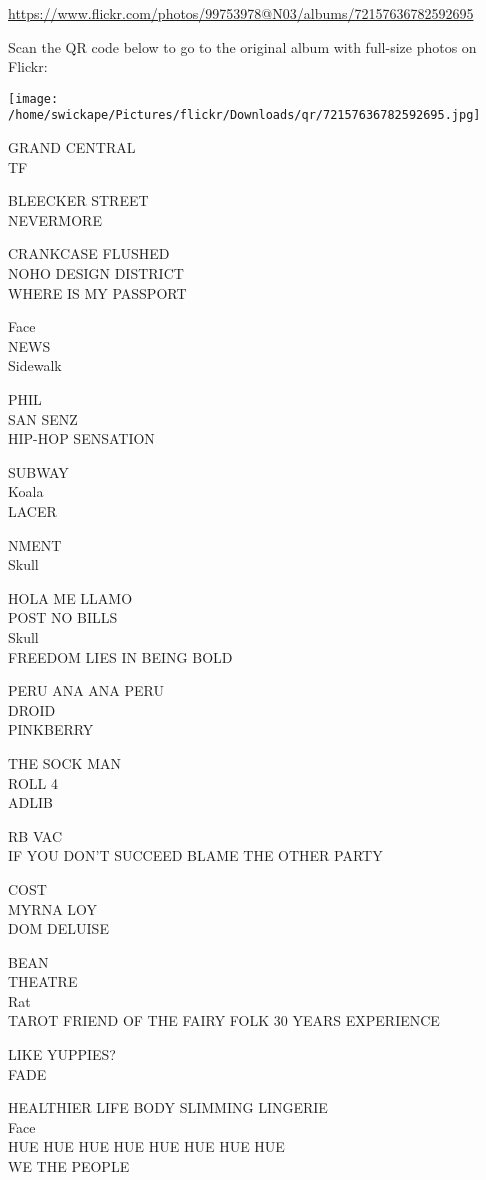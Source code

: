 \documentclass[10pt,letterpaper]{article}
\begin{document}
\url{https://www.flickr.com/photos/99753978@N03/albums/72157636782592695}

Scan the QR code below to go to the original album with full-size photos on Flickr:

\texttt{[image: /home/swickape/Pictures/flickr/Downloads/qr/72157636782592695.jpg]}
\pagebreak

GRAND CENTRAL\\
TF

BLEECKER STREET\\
NEVERMORE

CRANKCASE FLUSHED\\
NOHO DESIGN DISTRICT\\
WHERE IS MY PASSPORT

Face\\
NEWS\\
Sidewalk

PHIL\\
SAN SENZ\\
HIP{-}HOP SENSATION

SUBWAY\\
Koala\\
LACER

NMENT\\
Skull

HOLA ME LLAMO\\
POST NO BILLS\\
Skull\\
FREEDOM LIES IN BEING BOLD

PERU ANA ANA PERU\\
DROID\\
PINKBERRY

THE SOCK MAN\\
ROLL 4\\
ADLIB

RB VAC\\
IF YOU DON'T SUCCEED BLAME THE OTHER PARTY

COST\\
MYRNA LOY\\
DOM DELUISE

BEAN\\
THEATRE\\
Rat\\
TAROT FRIEND OF THE FAIRY FOLK 30 YEARS EXPERIENCE

LIKE YUPPIES?\\
FADE

HEALTHIER LIFE BODY SLIMMING LINGERIE\\
Face\\
HUE HUE HUE HUE HUE HUE HUE HUE\\
WE THE PEOPLE
\end{document}
